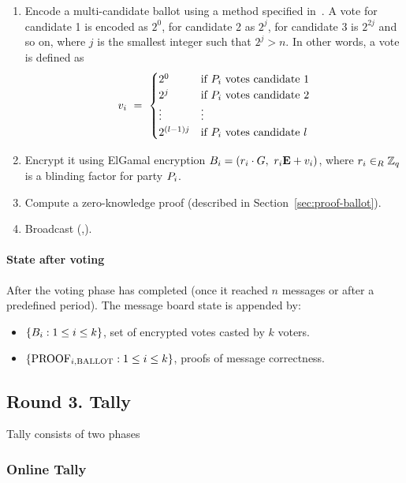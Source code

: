 \documentclass{article}
\begin{document}
\begin{enumerate}
    \item Encode a multi-candidate ballot using a method specified in~\cite{baudronPracticalMulticandidateElection2001}. A vote for candidate 1 is encoded as $2^0$, for candidate 2 as $2^j$, for candidate 3 is $2^{2j}$ and so on, where $j$ is the smallest integer such that $2^j > n$. In other words, a vote is defined as \[v_{i}\ =\ \begin{cases} 2^0 & \text{if } P_i \text{ votes candidate 1} \\ 2^j & \text{if } P_i \text{ votes candidate 2} \\ \vdots & \vdots \\ 2^{(l-1)j} & \text{if } P_i \text{ votes candidate $l$}\end{cases}\]
    
    \item Encrypt it using ElGamal encryption $\Ballot{i} = (\BlindingFactor{i} \cdot \G,\ \BlindingFactor{i} \EncryptionKey{} + \Vote{i})$, where $r_{i} \in_{R} \mathbb{Z}_q$ is a blinding factor for party $P_{i}$.
    
    \item Compute a zero-knowledge proof (described in Section~\ref{sec:proof-ballot}).
    \item Broadcast (,).
\end{enumerate}

\paragraph{State after voting}

After the voting phase has completed (once it reached $n$ messages or after a predefined period). The message board state is appended by:
\begin{itemize}
    \item $\{B_{i} : 1 \leq i \leq k\}$, set of encrypted votes casted by $k$ voters.
    \item $\{\textrm{PROOF}_{i,\textrm{BALLOT}} : 1 \leq i \leq k\}$, proofs of message correctness.
\end{itemize}

\subsection{Round 3. Tally}

Tally consists of two phases
\subsubsection{Online Tally}
\end{document}

